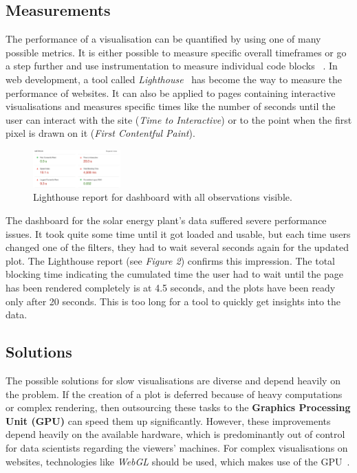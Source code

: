 \documentclass[11pt]{article}
\begin{document}
\subsection{Measurements}

The performance of a visualisation can be quantified by using one of many possible metrics. It is either possible to measure specific overall timeframes or go a step further and use instrumentation to measure individual code blocks ~\cite{isaacs_state_2014}. In web development, a tool called \textit{Lighthouse}~\cite{google_lighthouse_2021} has become the way to measure the performance of websites. It can also be applied to pages containing interactive visualisations and measures specific times like the number of seconds until the user can interact with the site (\textit{Time to Interactive}) or to the point when the first pixel is drawn on it (\textit{First Contentful Paint}).

\begin{figure}
    \includegraphics[width=0.3\textwidth]{./lighthouse-1.png}
    \caption{Lighthouse report for dashboard with all observations visible.}
\end{figure}

The dashboard for the solar energy plant's data suffered severe performance issues. It took quite some time until it got loaded and usable, but each time users changed one of the filters, they had to wait several seconds again for the updated plot. The Lighthouse report (see \textit{Figure 2}) confirms this impression. The total blocking time indicating the cumulated time the user had to wait until the page has been rendered completely is at 4.5 seconds, and the plots have been ready only after 20 seconds. This is too long for a tool to quickly get insights into the data.

\subsection{Solutions}

The possible solutions for slow visualisations are diverse and depend heavily on the problem. If the creation of a plot is deferred because of heavy computations or complex rendering, then outsourcing these tasks to the \textbf{Graphics Processing Unit (GPU)} can speed them up significantly. However, these improvements depend heavily on the available hardware, which is predominantly out of control for data scientists regarding the viewers' machines. For complex visualisations on websites, technologies like \textit{WebGL} should be used, which makes use of the GPU~\cite{mozilla_webgl_2022}.
\end{document}
